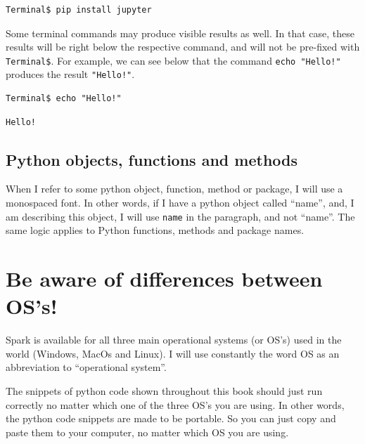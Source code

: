 \documentclass[
  11pt,
  letterpaper,
  DIV=11,
  numbers=noendperiod]{scrreprt}
\begin{document}
\begin{verbatim}
Terminal$ pip install jupyter
\end{verbatim}

Some terminal commands may produce visible results as well. In that
case, these results will be right below the respective command, and will
not be pre-fixed with \texttt{Terminal\$}. For example, we can see below
that the command \texttt{echo\ "Hello!"} produces the result
\texttt{"Hello!"}.

\begin{verbatim}
Terminal$ echo "Hello!"
\end{verbatim}

\begin{verbatim}
Hello!
\end{verbatim}

\subsection*{Python objects, functions and
methods}\label{python-objects-functions-and-methods}

When I refer to some python object, function, method or package, I will
use a monospaced font. In other words, if I have a python object called
``name'', and, I am describing this object, I will use \texttt{name} in
the paragraph, and not ``name''. The same logic applies to Python
functions, methods and package names.

\section*{Be aware of differences between
OS's!}\label{be-aware-of-differences-between-oss}


Spark is available for all three main operational systems (or OS's) used
in the world (Windows, MacOs and Linux). I will use constantly the word
OS as an abbreviation to ``operational system''.

The snippets of python code shown throughout this book should just run
correctly no matter which one of the three OS's you are using. In other
words, the python code snippets are made to be portable. So you can just
copy and paste them to your computer, no matter which OS you are using.
\end{document}
